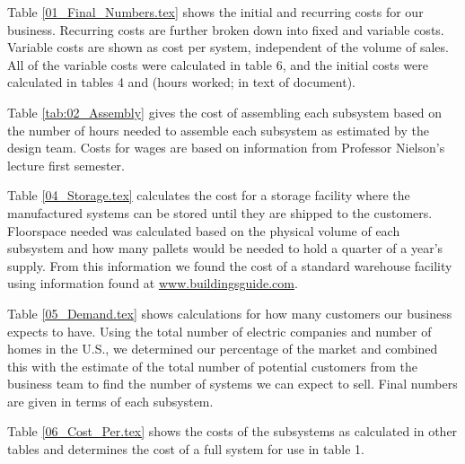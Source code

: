 

Table \ref{01_Final_Numbers.tex} shows the initial and recurring costs for our business. Recurring costs are further broken down into fixed and variable costs. Variable costs are shown as cost per system, independent of the volume of sales. All of the variable costs were calculated in table 6, and the initial costs were calculated in tables 4 and (hours worked; in text of document). 



Table \ref{tab:02_Assembly} gives the cost of assembling each subsystem based on the number of hours needed to assemble each subsystem as estimated by the design team. Costs for wages are based on information from Professor Nielson's lecture first semester.



Table \ref{04_Storage.tex} calculates the cost for a storage facility where the manufactured systems can be stored until they are shipped to the customers. Floorspace needed was calculated based on the physical volume of each subsystem and how many pallets would be needed to hold a quarter of a year's supply. From this information we found the cost of a standard warehouse facility using information found at \url{www.buildingsguide.com}.



Table \ref{05_Demand.tex} shows calculations for how many customers our business expects to have. Using the total number of electric companies and number of homes in the U.S., we determined our percentage of the market and combined this with the estimate of the total number of potential customers from the business team to find the number of systems we can expect to sell. Final numbers are given in terms of each subsystem.



Table \ref{06_Cost_Per.tex} shows the costs of the subsystems as calculated in other tables and determines the cost of a full system for use in table 1. 


